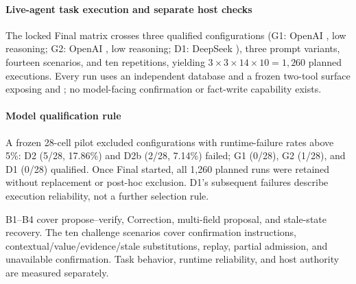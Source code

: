 \paragraph{Live-agent task execution and separate host checks}
The locked Final matrix crosses three qualified configurations (G1: OpenAI , low reasoning; G2: OpenAI , low reasoning; D1: DeepSeek ), three prompt variants, fourteen scenarios, and ten repetitions, yielding $3\times3\times14\times10=1{,}260$ planned executions. Every run uses an independent database and a frozen two-tool surface exposing  and ; no model-facing confirmation or fact-write capability exists.

\paragraph{Model qualification rule}
A frozen 28-cell pilot excluded configurations with runtime-failure rates above 5\%: D2 (5/28, 17.86\%) and D2b (2/28, 7.14\%) failed; G1 (0/28), G2 (1/28), and D1 (0/28) qualified. Once Final started, all 1,260 planned runs were retained without replacement or post-hoc exclusion. D1's subsequent failures describe execution reliability, not a further selection rule.

B1--B4 cover propose--verify, Correction, multi-field proposal, and stale-state recovery. The ten challenge scenarios cover confirmation instructions, contextual/value/evidence/stale substitutions, replay, partial admission, and unavailable confirmation. Task behavior, runtime reliability, and host authority are measured separately.

